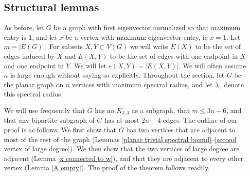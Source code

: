 \subsection{Structural lemmas}

As before, let $G$ be a graph with first eigenvector normalized so that maximum entry is $1$, and let $x$ be a vertex with maximum eigenvector entry, ie $x=1$. Let $m = |E(G)|$. For subsets $X, Y\subset V(G)$ we will write $E(X)$ to be the set of edges induced by $X$ and $E(X,Y)$ to be the set of edges with one endpoint in $X$ and one endpoint in $Y$. We will let $e(X,Y) = |E(X,Y)|$. We will often assume $n$ is large enough without saying so explicitly. Throughout the section, let $G$ be the planar graph on $n$ vertices with maximum spectral radius, and let $\lambda_1$ denote this spectral radius.

We will use frequently that $G$ has no $K_{3,3}$ as a subgraph, that $m\leq 3n-6$, and that any bipartite subgraph of $G$ has at most $2n-4$ edges. The outline of our proof is as follows. We first show that $G$ has two vertices that are adjacent to most of the rest of the graph (Lemmas \ref{planar trivial spectral bound}--\ref{second vertex of large degree}). We then show that the two vertices of large degree are adjacent (Lemma \ref{x connected to w}), and that they are adjacent to every other vertex (Lemma \ref{A empty}). The proof of the theorem follows readily.

